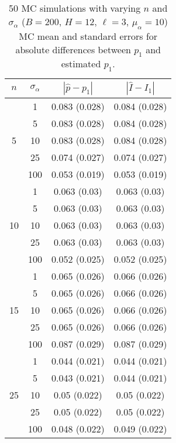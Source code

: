 \documentclass[12pt]{article}
\theoremstyle{definition}
\theoremstyle{definition}
\begin{document}
\begin{table}[H]
\caption{50 MC simulations  with varying $n$ and $\sigma_{\alpha}$ ($B = 200$, $H = 12$, $\ell = 3$, $\mu_{\alpha}=10$) \\ MC mean and standard errors for absolute differences between $p_1$ and estimated $p_1$.} \vspace{-.5cm} 
\begin{center}
  \begin{tabular}{cccc}
  $n$ & $\sigma_{\alpha}$ & $|\hat{p}-p_1|$ & $|\hat{I}- I_1|$ \\ 
  \hline
\multirow{5}{*}{5} & 1  & 0.083 (0.028) & 0.084 (0.028) \\ 
    & 5  & 0.083 (0.028) & 0.084 (0.028) \\ 
    & 10  & 0.083 (0.028) & 0.084 (0.028) \\ 
    & 25  & 0.074 (0.027) & 0.074 (0.027) \\ 
    & 100  & 0.053 (0.019) & 0.053 (0.019) \\[.15cm] 
    \hline 
   \multirow{5}{*}{10} & 1  & 0.063 (0.03) & 0.063 (0.03) \\ 
   & 5  & 0.063 (0.03) & 0.063 (0.03) \\ 
   & 10  & 0.063 (0.03) & 0.063 (0.03) \\ 
   & 25  & 0.063 (0.03) & 0.063 (0.03) \\ 
    & 100  & 0.052 (0.025) & 0.052 (0.025) \\[.15cm] 
     \hline 
  \multirow{5}{*}{15} & 1  & 0.065 (0.026) & 0.066 (0.026) \\ 
   & 5  & 0.065 (0.026) & 0.066 (0.026) \\ 
    & 10  & 0.065 (0.026) & 0.066 (0.026) \\ 
   & 25  & 0.065 (0.026) & 0.066 (0.026) \\ 
    & 100  & 0.087 (0.029) & 0.087 (0.029) \\[.15cm]  
     \hline 
   \multirow{5}{*}{25}& 1  & 0.044 (0.021) & 0.044 (0.021) \\ 
    & 5  & 0.043 (0.021) & 0.044 (0.021) \\ 
    & 10  & 0.05 (0.022) & 0.05 (0.022) \\ 
    & 25  & 0.05 (0.022) & 0.05 (0.022) \\ 
    & 100  & 0.048 (0.022) & 0.049 (0.022) \\   
  \end{tabular}
\end{center}
\end{table}
\end{document}
